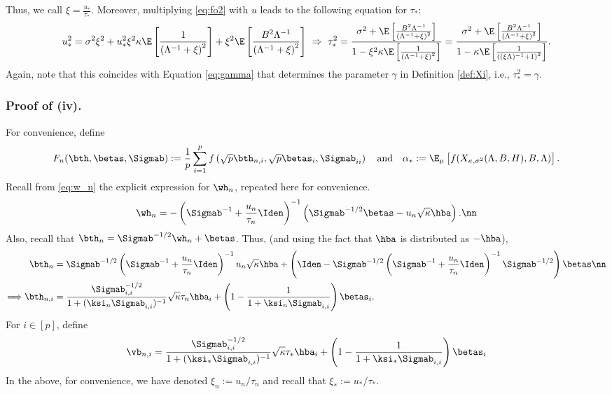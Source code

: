 Thus, we call $\xi=\frac{u_*}{\tau_*}$. Moreover, multiplying \eqref{eq:fo2} with $u$ leads to the following equation for $\tau_*$:
\begin{align}
u_*^2 = \sigma^2\xi^2 + u_*^2 \xi^2  \kappa \E\left[ \frac{1}{\left(\Lambda^{-1} +\xi\right)^2}\right] + \xi^2  \E\left[ \frac{B^2\Lambda^{-1}}{\left(\Lambda^{-1} + \xi\right)^2}\right] ~\Rightarrow~ \tau_*^2 = \frac{\sigma^2 + \E\left[ \frac{B^2\Lambda^{-1}}{\left(\Lambda^{-1} + \xi\right)^2}\right]}{1-\xi^2\kappa \E\left[ \frac{1}{\left(\Lambda^{-1} +\xi\right)^2}\right]} =  \frac{\sigma^2 + \E\left[ \frac{B^2\Lambda^{-1}}{\left(\Lambda^{-1} + \xi\right)^2}\right]}{1-\kappa \E\left[ \frac{1}{\left((\xi\Lambda)^{-1} +1\right)^2}\right]}.
\end{align}
{Again, note that this coincides with Equation \eqref{eq:gamma} that determines the parameter $\gamma$ in Definition \ref{def:Xi}, i.e., $\tau_*^2 = \gamma.$ }

\vspace{5pt}
\subsubsection{Proof of (iv).}  For convenience, define 
$$F_n(\bth,\betas,\Sigmab):=\frac{1}{p} \sum_{i=1}^{p} f\left(\sqrt{p}\bth_{n,i},\sqrt{p}\betas_{i},\Sigmab_{ii}\right)\quad\text{and}\quad\alpha_*:=\E_\mu\left[f(X_{\kappa,\sigma^2}(\Lambda,B,H),B,\Lambda)\right].$$
Recall from \eqref{eq:w_n} the explicit expression for $\wh_n$, repeated here for convenience.
\begin{align}
\wh_n = -\left(\Sigmab^{-1}+\frac{u_n}{\tau_n}\Iden\right)^{-1}\left(\Sigmab^{-1/2}\betas-u_n\sqrt{\kappa}\hba\right).\nn
\end{align}
Also, recall that $\bth_n = \Sigmab^{-1/2}\wh_n+\betas$. Thus,  (and using the fact that $\hba$ is distributed as $-\hba$),
\begin{align}
\bth_n &=\Sigmab^{-1/2}\left(\Sigmab^{-1}+\frac{u_n}{\tau_n}\Iden\right)^{-1}u_n\sqrt{\kappa}\hba + \left(\Iden-\Sigmab^{-1/2}\left(\Sigmab^{-1}+\frac{u_n}{\tau_n}\Iden\right)^{-1}\Sigmab^{-1/2}\right)\betas\nn\\
\Longrightarrow\bth_{n,i}&=\frac{{\Sigmab_{i,i}^{-1/2}}}{1+(\ksi_n\Sigmab_{i,i})^{-1}}\sqrt{\kappa}\tau_n\hba_i +\left(1-\frac{1}{1+\ksi_n\Sigmab_{i,i}}\right)\betas_i.\label{eq:betan}
\end{align}
For $i\in[p]$, define 
\begin{align}
\vb_{n,i} = \frac{{\Sigmab_{i,i}^{-1/2}}}{1+(\ksi_*\Sigmab_{i,i})^{-1}}\sqrt{\kappa}\tau_*\hba_i +\left(1-\frac{1}{1+\ksi_*\Sigmab_{i,i}}\right)\betas_i
\end{align}
In the above, for convenience, we have denoted $\xi_n:=u_n/\tau_n$ and recall that $\xi_*:=u_*/\tau_*$. 



